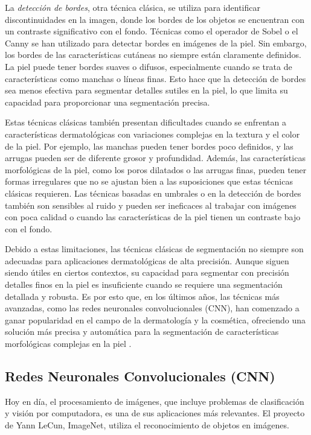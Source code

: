 La \textit{detección de bordes}, otra técnica clásica, se utiliza para identificar discontinuidades en la imagen, donde los bordes de los objetos se encuentran con un contraste significativo con el fondo. Técnicas como el operador de Sobel o el Canny se han utilizado para detectar bordes en imágenes de la piel. Sin embargo, los bordes de las características cutáneas no siempre están claramente definidos. La piel puede tener bordes suaves o difusos, especialmente cuando se trata de características como manchas o líneas finas. Esto hace que la detección de bordes sea menos efectiva para segmentar detalles sutiles en la piel, lo que limita su capacidad para proporcionar una segmentación precisa.

Estas técnicas clásicas también presentan dificultades cuando se enfrentan a características dermatológicas con variaciones complejas en la textura y el color de la piel. Por ejemplo, las manchas pueden tener bordes poco definidos, y las arrugas pueden ser de diferente grosor y profundidad. Además, las características morfológicas de la piel, como los poros dilatados o las arrugas finas, pueden tener formas irregulares que no se ajustan bien a las suposiciones que estas técnicas clásicas requieren. Las técnicas basadas en umbrales o en la detección de bordes también son sensibles al ruido y pueden ser ineficaces al trabajar con imágenes con poca calidad o cuando las características de la piel tienen un contraste bajo con el fondo.

Debido a estas limitaciones, las técnicas clásicas de segmentación no siempre son adecuadas para aplicaciones dermatológicas de alta precisión. Aunque siguen siendo útiles en ciertos contextos, su capacidad para segmentar con precisión detalles finos en la piel es insuficiente cuando se requiere una segmentación detallada y robusta. Es por esto que, en los últimos años, las técnicas más avanzadas, como las redes neuronales convolucionales (CNN), han comenzado a ganar popularidad en el campo de la dermatología y la cosmética, ofreciendo una solución más precisa y automática para la segmentación de características morfológicas complejas en la piel \parencite{yoo2020}.


\subsection{Redes Neuronales Convolucionales (CNN)}

Hoy en día, el procesamiento de imágenes, que incluye problemas de clasificación y visión por computadora, es una de sus aplicaciones más relevantes. El proyecto de Yann LeCun, ImageNet, utiliza el reconocimiento de objetos en imágenes.
	
